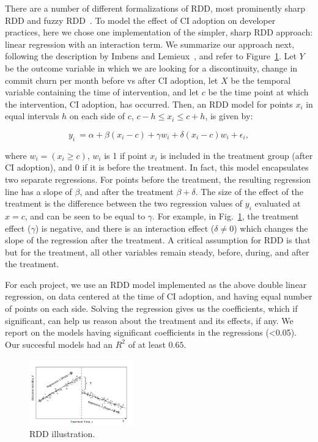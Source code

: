 There are a number of different formalizations of RDD, most prominently 
sharp RDD and fuzzy RDD~\cite{imbens2008regression}.
To model the effect of CI adoption on developer practices, here we chose one implementation
of the simpler, sharp RDD approach: linear regression with an interaction term.
We summarize our approach next, following the description by Imbens and 
Lemieux~\cite{imbens2008regression}, and refer to Figure~\ref{RDDIllustration}.
Let $Y$ be the outcome variable in which we are looking for a discontinuity, 
\eg change in commit churn per month before vs after CI adoption, let $X$ be the temporal variable containing the 
time of intervention, and let $c$ be the time point at which the intervention, \eg CI adoption, has occurred.
Then, an RDD model for points $x_i$ in equal intervals $h$ on each side of 
$c$, $c-h \le x_i \le c+h$, is given by:

\[y_i \ = \alpha + \beta(x_i-c) + \gamma w_i + \delta(x_i-c)w_i + \epsilon_i,\]

\noindent where $w_i = (x_i \geq c)$, \ie $w_i$ is 1 if point $x_i$ is included in 
the treatment group (\eg after CI adoption), and 0 if it is before the treatment.
In fact, this model encapsulates two separate regressions.
For points before the treatment, the resulting regression line has a slope of 
$\beta$, and after the treatment $\beta + \delta$.
The size of the effect of the treatment is the difference between the two 
regression values of $y_i$ evaluated at $x=c$, and can be seen to be equal 
to $\gamma$.
For example, in Fig.~\ref{RDDIllustration}, the treatment effect ($\gamma$) is negative, and there is an interaction effect ($\delta \neq 0$) which changes the slope of the regression after the treatment.
A critical assumption for RDD is that but for the treatment, all other variables remain steady, before, during, and after the treatment.

For each project, we use an RDD model implemented as the above 
double linear regression, on data centered at the time of CI adoption, and 
having equal number of points on each side.
Solving the regression gives us the coefficients, which if significant, can help us reason about the treatment and its effects, if any.
We report on the models having significant coefficients in the regressions (<0.05). Our succesful models had an $R^2$ of at least $0.65$. 



\begin{figure}[t]
	\centering
	\includegraphics[width=0.4\textwidth, clip=true, trim=0 15 15 50]{RDD_plot.png}
	\caption{RDD illustration.}\vspace{-0.5cm}
	\label{RDDIllustration}
\end{figure}


